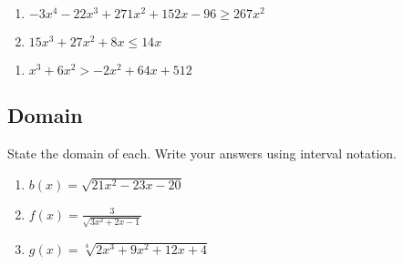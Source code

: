 \begin{multicols}{2}
\begin{enumerate}	\setcounter{enumi}{\value{Review}}
\item $-3x^4 - 22x^3 + 271x^2 + 152x - 96 \geq 267x^2$
\item $15x^3 + 27x^2 + 8x \leq 14x$
\end{enumerate}	\setcounter{Review}{\value{enumi}}
\end{multicols}
\begin{multicols}{2}
\begin{enumerate}	\setcounter{enumi}{\value{Review}}
\item $x^3 + 6x^2 > -2x^2 + 64x + 512$

\end{enumerate}	\setcounter{enumi}{\value{Review}}
\end{multicols}

\subsection*{Domain}
State the domain of each. Write your answers using interval notation.
\begin{enumerate}	\setcounter{Review}{\value{enumi}}
\item $b(x) = \sqrt{21x^2 - 23x - 20}$
\item $f(x) = \frac{3}{\sqrt{3x^2 + 2x - 1}}$
\item $g(x) = \sqrt[4]{2x^3+9x^2+12x+4}$
\end{enumerate}	\setcounter{enumi}{\value{Review}}

